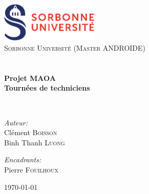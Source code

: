 
\begin{titlepage}
\begin{center}

\includegraphics[width=0.35\textwidth]{pictures/logo.jpg}~\\[1cm]

\textsc{\LARGE Sorbonne Université (Master ANDROIDE)}\\[1.5cm]

\textsc{\Large }\\[0.5cm]

\HRule \\[0.4cm]

{\huge \bfseries Projet MAOA\\
Tournées de techniciens \\[0.4cm] }

\HRule \\[1.5cm]

\begin{minipage}{0.4\textwidth}
\begin{flushleft} \large
\emph{Auteur:}\\
Clément \textsc{Boisson}\\
Binh Thanh \textsc{Luong}
\end{flushleft}
\end{minipage}
\begin{minipage}{0.4\textwidth}
\begin{flushright} \large
\emph{Encadrants:} \\
Pierre \textsc{Fouilhoux}\\
\end{flushright}
\end{minipage}

\vfill

{\large \today}

\end{center}
\end{titlepage}